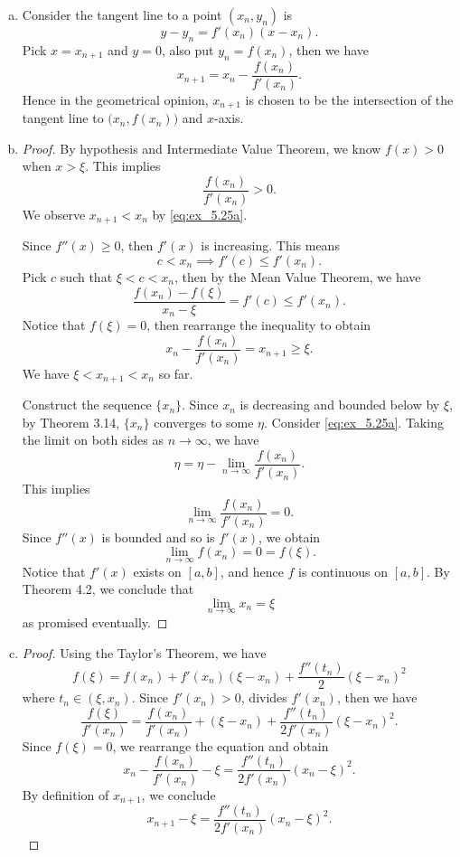 \begin{Exercise}
	\begin{enumerate}[(a)]
		\item 
		\begin{solution}
			Consider the tangent line to a point $(x_n, y_n)$ is
			$$
			y-y_n = f'(x_n) (x-x_n).
			$$
			Pick $x = x_{n+1}$ and $y = 0$, also put $y_n = f(x_n)$, then we have
			\begin{equation}\label{eq:ex_5.25a}
			x_{n+1} = x_n - \frac{f(x_n)}{f'(x_n)}.
			\end{equation}
			Hence in the geometrical opinion, $x_{n+1}$ is chosen to be the intersection of the tangent line to $\big(x_n, f(x_n)\big)$ and $x$-axis.
		\end{solution}
		
		\item
		\begin{proof}
			By hypothesis and Intermediate Value Theorem, we know $f(x) > 0$ when $x > \xi$. This implies
			$$
			\frac{f(x_n)}{f'(x_n)} > 0.
			$$
			We observe $x_{n+1} < x_n$ by \eqref{eq:ex_5.25a}.
			
			Since $f''(x) \geq 0$, then $f'(x)$ is increasing. This means
			$$
			c < x_n \implies f'(c) \leq f'(x_n).
			$$
			Pick $c$ such that $\xi < c < x_n$, then by the Mean Value Theorem, we have
			$$
			\frac{f(x_n)-f(\xi)}{x_n-\xi} = f'(c) \leq f'(x_n).
			$$
			Notice that $f(\xi) = 0$, then rearrange the inequality to obtain
			$$
			x_n - \frac{f(x_n)}{f'(x_n)} = x_{n+1}\geq \xi.
			$$
			We have $\xi < x_{n+1} < x_n$ so far.
			
			Construct the sequence $\{x_n\}$.
			Since $x_n$ is decreasing and bounded below by $\xi$, by Theorem 3.14, $\{x_n\}$ converges to some $\eta$.
			Consider \eqref{eq:ex_5.25a}.
			Taking the limit on both sides as $n\to\infty$, we have
			$$
			\eta = \eta - \lim_{n\to\infty}\frac{f(x_n)}{f'(x_n)}.
			$$
			This implies
			$$
			\lim_{n\to\infty}\frac{f(x_n)}{f'(x_n)} = 0.
			$$
			Since $f''(x)$ is bounded and so is $f'(x)$, we obtain
			$$
			\lim_{n\to\infty}f(x_n) = 0 = f(\xi).
			$$
			Notice that $f'(x)$ exists on $[a,b]$, and hence $f$ is continuous on $[a,b]$. 
			By Theorem 4.2, we conclude that
			$$
			\lim_{n\to\infty}x_n = \xi
			$$
			as promised eventually.
		\end{proof}
		
		\item
		\begin{proof}
			Using the Taylor's Theorem, we have
			$$
			f(\xi) = f(x_n) + f'(x_n)(\xi-x_n)+\frac{f''(t_n)}{2}(\xi-x_n)^2
			$$
			where $t_n\in(\xi, x_n)$.
			Since $f'(x_n)> 0$, divides $f'(x_n)$, then we have
			$$
			\frac{f(\xi)}{f'(x_n)} = \frac{f(x_n)}{f'(x_n)} + (\xi-x_n) + \frac{f''(t_n)}{2f'(x_n)}(\xi-x_n)^2.
			$$
			Since $f(\xi) = 0$, we rearrange the equation and obtain
			$$
			x_n - \frac{f(x_n)}{f'(x_n)} - \xi = \frac{f''(t_n)}{2f'(x_n)}(x_n-\xi)^2.
			$$
			By definition of $x_{n+1}$, we conclude
			\begin{equation}\label{eq:ex_5.25d}
			x_{n+1} - \xi = \frac{f''(t_n)}{2f'(x_n)}(x_n-\xi)^2.
			\end{equation}
		\end{proof}
		

\end{enumerate}
\end{Exercise}
